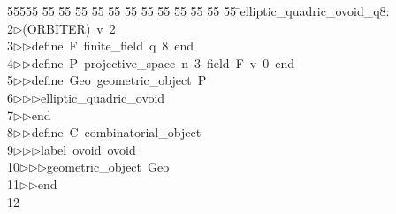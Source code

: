 %
%
\begin{tabbing}
55555 \= 55 \= 55 \= 55 \= 55 \= 55 \= 55 \= 55 \= 55 \= 55 \= 55 \= 55 \= 55 \= \>elliptic\_quadric\_ovoid\_q8:\\[0pt]
2\>$\triangleright$\>(ORBITER)\ v\ 2\ \\[0pt]
3\>$\triangleright$\>$\triangleright$\>define\ F\ finite\_field\ q\ 8\ end\ \\[0pt]
4\>$\triangleright$\>$\triangleright$\>define\ P\ projective\_space\ n\ 3\ field\ F\ v\ 0\ end\ \\[0pt]
5\>$\triangleright$\>$\triangleright$\>define\ Geo\ geometric\_object\ P\ \\[0pt]
6\>$\triangleright$\>$\triangleright$\>$\triangleright$\>elliptic\_quadric\_ovoid\ \\[0pt]
7\>$\triangleright$\>$\triangleright$\>end\ \\[0pt]
8\>$\triangleright$\>$\triangleright$\>define\ C\ combinatorial\_object\ \\[0pt]
9\>$\triangleright$\>$\triangleright$\>$\triangleright$\>label\ ovoid\ ovoid\ \\[0pt]
10\>$\triangleright$\>$\triangleright$\>$\triangleright$\>geometric\_object\ Geo\ \\[0pt]
11\>$\triangleright$\>$\triangleright$\>end\\[0pt]
12\>\end{tabbing}
